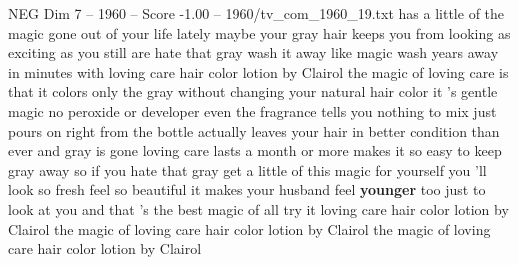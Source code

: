 \begin{textsample}{NEG Dim 7 – 1960 – Score -1.00 – 1960/tv\_com\_1960\_19.txt}  \label{ex:f7_neg_077}
has a little of the magic gone out of your life lately maybe your gray hair keeps you from looking as exciting as you still are hate that gray wash it away like magic wash years away in minutes with loving care hair color lotion by Clairol the magic of loving care is that it colors only the gray without changing your natural hair color it 's gentle magic no peroxide or developer even the fragrance tells you nothing to mix just pours on right from the bottle actually leaves your hair in better condition than ever and gray is gone loving care lasts a month or more makes it so easy to keep gray away so if you hate that gray get a little of this magic for yourself you 'll look so fresh feel so beautiful it makes your husband feel \textbf{younger} too just to look at you and that 's the best magic of all try it loving care hair color lotion by Clairol the magic of loving care hair color lotion by Clairol the magic of loving care hair color lotion by Clairol

\end{textsample}
